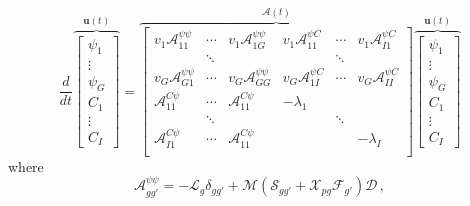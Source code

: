 \begin{equation}
\frac{d}{dt} 
\overbrace{\left[ 
  \begin{array}{c}
    \psi_1    \\
    \vdots     \\
    \psi_G    \\
    C_1       \\
    \vdots    \\
    C_I      
  \end{array} 
\right]}^{\mathbf{u}(t)}
= 
\overbrace{
\left[ 
  \begin{array}{cccccc}
     v_1 \mathcal{A}^{\psi \psi}_{11} & \cdots  & v_1 \mathcal{A}^{\psi \psi}_{1G}  & 
     v_1 \mathcal{A}^{\psi C}_{11}    & \cdots  & v_1 \mathcal{A}^{\psi C}_{I1}     \\
%
                                      & \ddots  &                                   &                      
                                      & \ddots  &                                   \\
%
     v_G \mathcal{A}^{\psi \psi}_{G1} & \cdots  & v_G \mathcal{A}^{\psi \psi}_{GG}  & 
     v_G \mathcal{A}^{\psi C}_{1I}    & \cdots  & v_G \mathcal{A}^{\psi C}_{II}     \\
%
    \mathcal{A}^{C \psi}_{11}         & \cdots  & \mathcal{A}^{C \psi}_{11}         & 
    -\lambda_1                        &         &                                   \\
%
                                      & \ddots  &                                   & 
                                      & \ddots  &                                   \\
%
    \mathcal{A}^{C \psi}_{I1}         & \cdots  & \mathcal{A}^{C \psi}_{11}         & 
                                      &         & -\lambda_I                        \\
  \end{array} 
\right]}^{\mathcal{A}(t)}
\overbrace{
\left[ 
  \begin{array}{c}
    \psi_1    \\
    \vdots     \\
    \psi_G    \\
    C_1       \\
    \vdots    \\
    C_I   
  \end{array} 
\right]}^{\mathbf{u}(t)}
\label{eq:tdtefull}
\end{equation}
where
\begin{equation}
 \mathcal{A}^{\psi \psi}_{gg'} = -\mathcal{L}_g\delta_{gg'} + \mathcal{M} \left ( \mathcal{S}_{gg'} + \mathcal{X}_{pg} \mathcal{F}_{g'} \right ) \mathcal{D} \, ,
\end{equation}
